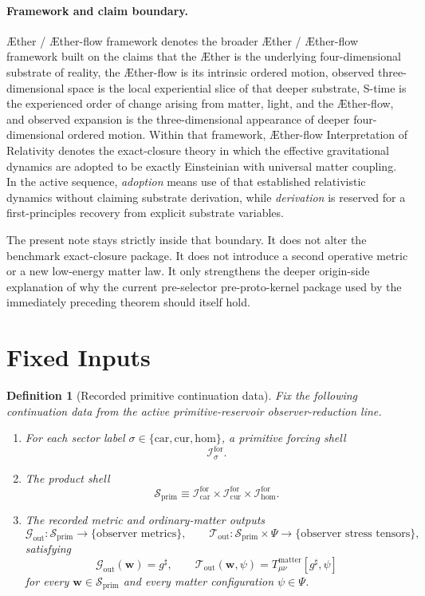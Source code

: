 \documentclass[11pt]{article}
\newcommand{\Aether}{\AE{}ther}
\newcommand{\Aflow}{\AE{}ther-flow}
\newcommand{\TheoryName}{\Aflow{} Interpretation of Relativity}
\newcommand{\TheoryProgram}{\Aether{} / \Aflow{} framework}
\newcommand{\CompletedMetric}{g^{\sharp}}
\newcommand{\MatterSpace}{\Psi}
\newcommand{\Car}{\mathrm{car}}
\newcommand{\Cur}{\mathrm{cur}}
\newcommand{\Hom}{\mathrm{hom}}
\newcommand{\ForSpace}[1]{\mathcal I_{#1}^{\mathrm{for}}}
\newcommand{\PrimShell}{\mathcal S_{\mathrm{prim}}}
\newcommand{\MetricOut}{\mathscr G_{\mathrm{out}}}
\newcommand{\MatterOut}{\mathscr T_{\mathrm{out}}}
\newtheorem{definition}{Definition}
\begin{document}
\paragraph{Framework and claim boundary.}
\TheoryProgram{} denotes the broader \Aether{} / \Aflow{} framework built on the claims that the \Aether{} is the underlying four-dimensional substrate of reality, the \Aflow{} is its intrinsic ordered motion, observed three-dimensional space is the local experiential slice of that deeper substrate, S-time is the experienced order of change arising from matter, light, and the \Aflow{}, and observed expansion is the three-dimensional appearance of deeper four-dimensional ordered motion. Within that framework, \TheoryName{} denotes the exact-closure theory in which the effective gravitational dynamics are adopted to be exactly Einsteinian with universal matter coupling. In the active sequence, \emph{adoption} means use of that established relativistic dynamics without claiming substrate derivation, while \emph{derivation} is reserved for a first-principles recovery from explicit substrate variables.

The present note stays strictly inside that boundary. It does not alter the benchmark exact-closure package. It does not introduce a second operative metric or a new low-energy matter law. It only strengthens the deeper origin-side explanation of why the current pre-selector pre-proto-kernel package used by the immediately preceding theorem should itself hold.

\section{Fixed Inputs}

\begin{definition}[Recorded primitive continuation data]
\label{def:fixed}
Fix the following continuation data from the active primitive-reservoir observer-reduction line.
\begin{enumerate}
    \item For each sector label \(\sigma\in\{\Car,\Cur,\Hom\}\), a primitive forcing shell
    \[
    \ForSpace{\sigma}.
    \]
    \item The product shell
    \[
    \PrimShell
    \equiv
    \ForSpace{\Car}\times \ForSpace{\Cur}\times \ForSpace{\Hom}.
    \]
    \item The recorded metric and ordinary-matter outputs
    \[
    \MetricOut:\PrimShell\to\{\text{observer metrics}\},
    \qquad
    \MatterOut:\PrimShell\times\MatterSpace\to\{\text{observer stress tensors}\},
    \]
    satisfying
    \begin{equation}
    \MetricOut(\mathbf w)=\CompletedMetric,
    \qquad
    \MatterOut(\mathbf w,\psi)
    =
    T_{\mu\nu}^{\mathrm{matter}}[\CompletedMetric,\psi]
    \label{eq:fixedoutputs}
    \end{equation}
    for every \(\mathbf w\in\PrimShell\) and every matter configuration \(\psi\in\MatterSpace\).
\end{enumerate}
\end{definition}
\end{document}
